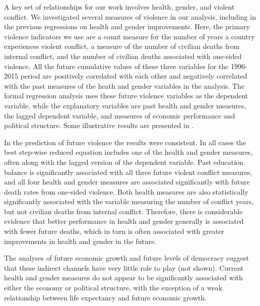 \documentclass[12pt]{article}
\begin{document}
A key set of relationships for our work involves health, gender, and violent conflict. We investigated several measures of violence in our analysis, including in the previous regressions on health and gender improvements. Here, the primary violence indicators we use are a count measure for the number of years a country experiences violent conflict, a measure of the number of civilian deaths from internal conflict, and the number of civilian deaths associated with one-sided violence. All the future cumulative values of these three variables for the 1996-2015 period are positively correlated with each other and negatively correlated with the past measures of the heath and gender variables in the analysis. The formal regression analysis uses these future violence variables as the dependent variable, while the explanatory variables are past health and gender measures, the lagged dependent variable, and measures of economic performance and political structure. Some illustrative results are presented in .




In the prediction of future violence the results were consistent. In all cases the best step-wise reduced equation includes one of the health and gender measures, often along with the lagged version of the dependent variable. Past education balance is significantly associated with all three future violent conflict measures, and all four health and gender measures are associated significantly with future death rates from one-sided violence. Both health measures are also statistically significantly associated with the variable measuring the number of conflict years, but not civilian deaths from internal conflict. Therefore, there is considerable evidence that better performance in health and gender generally is associated with fewer future deaths, which in turn is often associated with greater improvements in health and gender in the future.

The analyses of future economic growth and future levels of democracy suggest that these indirect channels have very little role to play (not shown). Current health and gender measures do not appear to be significantly associated with either the economy or political structure, with the exception of a weak relationship between life expectancy and future economic growth.
\end{document}
